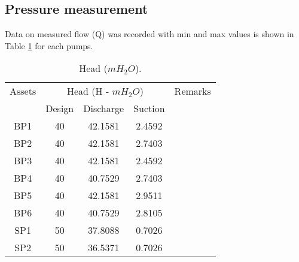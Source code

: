 \subsection{Pressure measurement} \label{ch04pressure}



Data on measured flow (Q) was recorded with min and max values is shown in Table \ref{ch04_tbl_flow02} for each pumps. %



\begin{table}[!h]

	\caption{Head ($mH_2O$).}

	\label{ch04_tbl_flow02}

	{\footnotesize

\begin{tabular}{c|c|c|c|l}

	\hline

	Assets & \multicolumn{3}{c|}{Head (H - $mH_2O$)} & Remarks \\ 

	\cline{2-4}

	& Design & Discharge & Suction &  \\ 

	\hline

	BP1 & 40 & 42.1581 & 2.4592 &  \\ 

	BP2 & 40 & 42.1581 & 2.7403 &  \\ 

	BP3 & 40 & 42.1581 & 2.4592 &  \\ 

	BP4 & 40 & 40.7529 & 2.7403 &  \\ 

	BP5 & 40 & 42.1581 & 2.9511 &  \\ 

	BP6 & 40 & 40.7529 & 2.8105 &  \\ 

	SP1 & 50 & 37.8088 & 0.7026 &  \\ 

	SP2 & 50 & 36.5371 & 0.7026 &  \\ 

	\hline

\end{tabular}

	}

\end{table}





